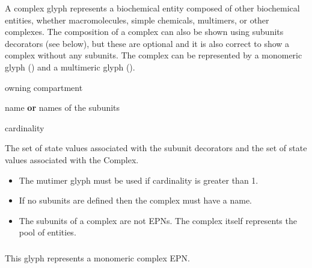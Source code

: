 A complex glyph represents a biochemical entity composed of other
biochemical entities, whether macromolecules, simple chemicals,
multimers, or other complexes. The composition of a complex can also
be shown using subunits decorators (see below), but these are optional
and it is also correct to show a complex without any subunits. The
complex can be represented by a monomeric glyph () and a multimeric glyph ().

\begin{glyphDescription}
\begin{glyphIdentity}
  \item owning compartment
  \item name \textbf{or} names of the subunits 
  \item cardinality
  \item The set of state values associated with the subunit decorators
    and the set of state values associated with the Complex.
  \end{glyphIdentity}
\glyphRules
\begin{itemize}
  \item The mutimer glyph must be used if cardinality is greater than
    1.
  \item If no subunits are defined then the complex must have a name.
  \item The subunits of a complex are not EPNs. The complex itself
    represents the pool of entities.
\end{itemize}
\end{glyphDescription}


\subparagraph{}

This glyph represents a monomeric complex EPN.

